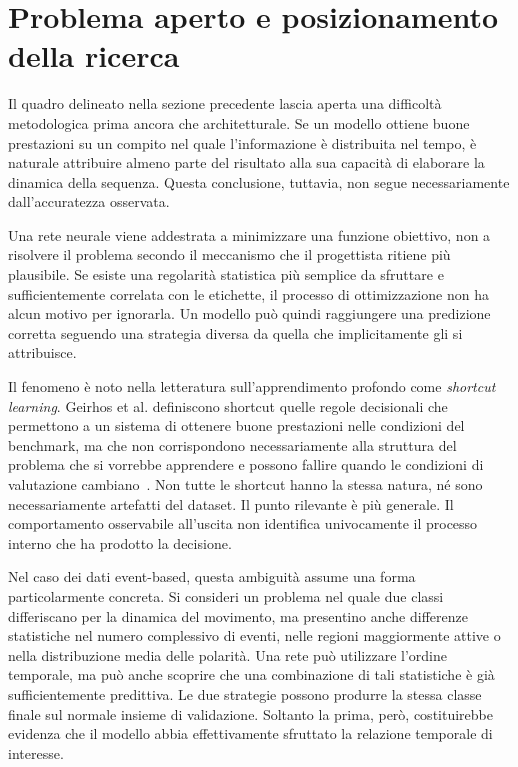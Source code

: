 \section{Problema aperto e posizionamento della ricerca}
\label{sec:problema_aperto}

Il quadro delineato nella sezione precedente lascia aperta una difficoltà metodologica prima ancora che architetturale. Se un modello ottiene buone prestazioni su un compito nel quale l'informazione è distribuita nel tempo, è naturale attribuire almeno parte del risultato alla sua capacità di elaborare la dinamica della sequenza. Questa conclusione, tuttavia, non segue necessariamente dall'accuratezza osservata.

Una rete neurale viene addestrata a minimizzare una funzione obiettivo, non a risolvere il problema secondo il meccanismo che il progettista ritiene più plausibile. Se esiste una regolarità statistica più semplice da sfruttare e sufficientemente correlata con le etichette, il processo di ottimizzazione non ha alcun motivo per ignorarla. Un modello può quindi raggiungere una predizione corretta seguendo una strategia diversa da quella che implicitamente gli si attribuisce.

Il fenomeno è noto nella letteratura sull'apprendimento profondo come \emph{shortcut learning}. Geirhos et al. definiscono shortcut quelle regole decisionali che permettono a un sistema di ottenere buone prestazioni nelle condizioni del benchmark, ma che non corrispondono necessariamente alla struttura del problema che si vorrebbe apprendere e possono fallire quando le condizioni di valutazione cambiano~\cite{geirhos2020shortcut}. Non tutte le shortcut hanno la stessa natura, né sono necessariamente artefatti del dataset. Il punto rilevante è più generale. Il comportamento osservabile all'uscita non identifica univocamente il processo interno che ha prodotto la decisione.

Nel caso dei dati event-based, questa ambiguità assume una forma particolarmente concreta. Si consideri un problema nel quale due classi differiscano per la dinamica del movimento, ma presentino anche differenze statistiche nel numero complessivo di eventi, nelle regioni maggiormente attive o nella distribuzione media delle polarità. Una rete può utilizzare l'ordine temporale, ma può anche scoprire che una combinazione di tali statistiche è già sufficientemente predittiva. Le due strategie possono produrre la stessa classe finale sul normale insieme di validazione. Soltanto la prima, però, costituirebbe evidenza che il modello abbia effettivamente sfruttato la relazione temporale di interesse.

